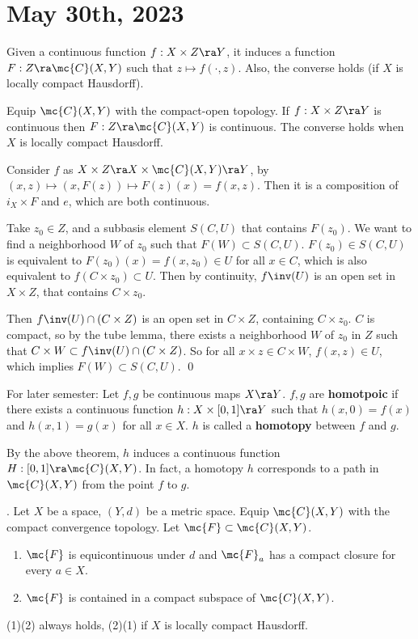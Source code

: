 \section*{May 30th, 2023}

Given a continuous function \(f : X \times Z \ra Y\), it induces a function \(F : Z \ra \mc{C}(X, Y)\) such that \(z \mapsto f(\cdot, z)\). Also, the converse holds (if \(X\) is locally compact Hausdorff).

 Equip \(\mc{C}(X, Y)\) with the compact-open topology. If \(f : X \times Z \ra Y\) is continuous then \(F : Z \ra \mc{C}(X, Y)\) is continuous. The converse holds when \(X\) is locally compact Hausdorff.

\pf \note{\mimpd} Consider \(f\) as \(X \times Z \ra X \times \mc{C}(X, Y) \ra Y\), by \((x, z) \mapsto (x, F(z)) \mapsto F(z)(x) = f(x, z)\). Then it is a composition of \(i_X \times F\) and \(e\), which are both continuous.

\note{\mimp} Take \(z_0 \in Z\), and a subbasis element \(S(C, U)\) that contains \(F(z_0)\). We want to find a neighborhood \(W\) of \(z_0\) such that \(F(W) \subset S(C, U)\). \(F(z_0) \in S(C, U)\) is equivalent to \(F(z_0)(x) = f(x, z_0) \in U\) for all \(x \in C\), which is also equivalent to \(f(C \times z_0) \subset U\). Then by continuity, \(f\inv(U)\) is an open set in \(X \times Z\), that contains \(C \times z_0\).

Then \(f\inv(U) \cap (C \times Z)\) is an open set in \(C \times Z\), containing \(C \times z_0\). \(C\) is compact, so by the tube lemma, there exists a neighborhood \(W\) of \(z_0\) in \(Z\) such that \(C \times W \subset f\inv(U) \cap (C \times Z)\). So for all \(x \times z \in C \times W\), \(f(x, z) \in U\), which implies \(F(W) \subset S(C, U)\). \qed

\rmk For later semester: Let \(f, g\) be continuous maps \(X \ra Y\). \(f, g\) are \textbf{homotpoic} if there exists a continuous function \(h : X \times [0, 1] \ra Y\) such that \(h(x, 0) = f(x)\) and \(h(x, 1) = g(x)\) for all \(x \in X\). \(h\) is called a \textbf{homotopy} between \(f\) and \(g\).

By the above theorem, \(h\) induces a continuous function \(H : [0, 1] \ra \mc{C}(X, Y)\). In fact, a homotopy \(h\) corresponds to a path in \(\mc{C}(X, Y)\) from the point \(f\) to \(g\).


\thm. Let \(X\) be a space, \((Y, d)\) be a metric space. Equip \(\mc{C}(X, Y)\) with the compact convergence topology. Let \(\mc{F} \subset \mc{C}(X, Y)\).
\begin{enumerate}
    \item \(\mc{F}\) is equicontinuous under \(d\) and \(\mc{F}_a\) has a compact closure for every \(a \in X\).
    \item \(\mc{F}\) is contained in a compact subspace of \(\mc{C}(X, Y)\).
\end{enumerate}
(1)\mimp(2) always holds, (2)\mimp(1) if \(X\) is locally compact Hausdorff.


